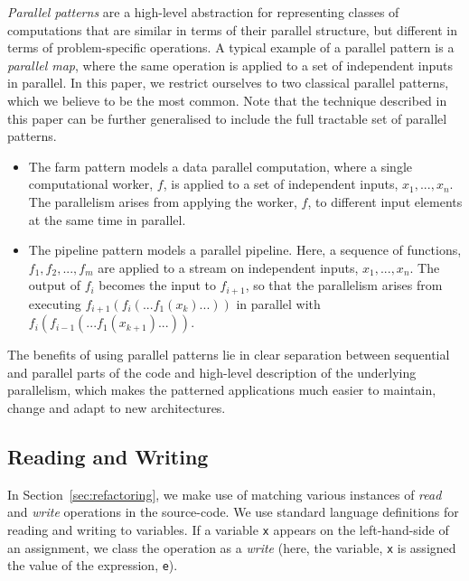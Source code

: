 \noindent
\emph{Parallel patterns} are a high-level abstraction for representing classes of computations that are similar in terms of their parallel structure, but different in terms of problem-specific operations. A typical example of a parallel pattern is a \emph{parallel map}, where the same operation is applied to a set of independent inputs in parallel. 
In this paper, we restrict ourselves to two classical parallel patterns, which we believe to be the most common. Note that the technique described in this paper can be further generalised to include the full tractable set of parallel patterns.
\begin{itemize}
    \item The farm pattern models a data parallel computation, where a single computational worker, $f$, is applied to a set of independent inputs, $x_{1}, ..., x_{n}$. The parallelism arises from applying the worker, $f$, to different input elements at the same time in parallel. 
    \item The pipeline pattern models a parallel pipeline. Here, a sequence of functions, $f_{1}, f_{2}, ..., f_{m}$ are applied to a stream on independent inputs, $x_{1}, ..., x_{n}$. The output of $f_{i}$ becomes the input to $f_{i+1}$, so that the parallelism arises from executing $f_{i+1}(f_{i}(...f_{1}(x_{k})...))$ in parallel with $f_{i}(f_{i-1}(...f_{1}(x_{k+1})...))$.
\end{itemize}

The benefits of using parallel patterns lie in clear separation between sequential and parallel parts of the code and high-level description of the underlying parallelism, which makes the patterned applications much easier to maintain, change and adapt to new architectures. 

\subsection{Reading and Writing} \label{sec:readwrite}
In Section~\ref{sec:refactoring}, we make use of matching various instances of \emph{read} and \emph{write} operations in the source-code. We use standard language definitions for reading and writing to variables.
If a variable \lstinline{x} appears on the left-hand-side of an assignment, we class the operation as a \emph{write} (here, the variable, \lstinline{x} is assigned the value of the expression, \lstinline{e}).

